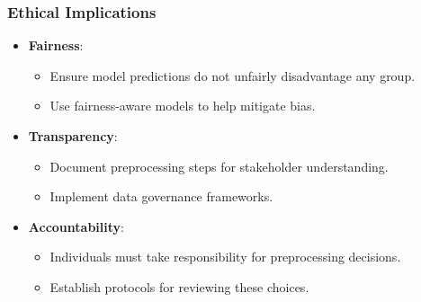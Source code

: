\documentclass[aspectratio=169]{beamer}
\begin{document}
\begin{frame}[fragile]
    \frametitle{Ethical Implications}
    \begin{itemize}
        \item \textbf{Fairness}:
        \begin{itemize}
            \item Ensure model predictions do not unfairly disadvantage any group.
            \item Use fairness-aware models to help mitigate bias.
        \end{itemize}

        \item \textbf{Transparency}:
        \begin{itemize}
            \item Document preprocessing steps for stakeholder understanding.
            \item Implement data governance frameworks.
        \end{itemize}

        \item \textbf{Accountability}:
        \begin{itemize}
            \item Individuals must take responsibility for preprocessing decisions.
            \item Establish protocols for reviewing these choices.
        \end{itemize}
    \end{itemize}
\end{frame}
\end{document}
